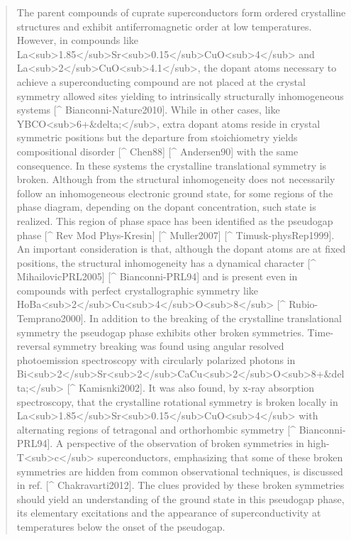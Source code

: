 \begin{quote}
The parent compounds of cuprate superconductors form ordered crystalline structures and exhibit antiferromagnetic order at low temperatures. 
However,  in compounds like La<sub>1.85</sub>Sr<sub>0.15</sub>CuO<sub>4</sub> and La<sub>2</sub>CuO<sub>4.1</sub>, the dopant atoms necessary to achieve a superconducting compound are not placed at the crystal symmetry allowed sites yielding to intrinsically structurally inhomogeneous systems [^ Bianconni-Nature2010]. 
While in other cases, like YBCO<sub>6+&delta;</sub>, extra dopant atoms reside in crystal symmetric positions but the departure from stoichiometry yields compositional disorder [^ Chen88] [^ Andersen90] with the same consequence. 
In these systems the crystalline translational symmetry is broken. 
Although from the structural inhomogeneity does not necessarily follow an inhomogeneous electronic ground state, for some regions of the phase diagram, depending on the dopant concentration, such state is realized. 
This region of phase space has been identified as the pseudogap phase [^ Rev Mod Phys-Kresin] [^ Muller2007] [^ Timusk-physRep1999]. 
An important consideration is that, although the dopant atoms are at fixed positions, the structural inhomogeneity has a dynamical character [^ MihailovicPRL2005] [^ Bianconni-PRL94] and is present even in compounds with perfect crystallographic symmetry like HoBa<sub>2</sub>Cu<sub>4</sub>O<sub>8</sub> [^ Rubio-Temprano2000]. 
In addition to the breaking of the crystalline translational symmetry the pseudogap phase exhibits other broken symmetries. 
Time-reversal symmetry breaking was found using angular resolved photoemission spectroscopy with circularly polarized photons in Bi<sub>2</sub>Sr<sub>2</sub>CaCu<sub>2</sub>O<sub>8+&delta;</sub> [^ Kamisnki2002]. 
It was also found, by x-ray absorption spectroscopy, that the crystalline rotational symmetry is broken locally in La<sub>1.85</sub>Sr<sub>0.15</sub>CuO<sub>4</sub> with alternating regions of tetragonal and orthorhombic symmetry [^ Bianconni-PRL94].
A perspective of the observation of broken symmetries in high-T<sub>c</sub> superconductors, emphasizing that some of these broken symmetries are hidden from common observational techniques, is discussed in ref. [^ Chakravarti2012]. 
The clues provided by these broken symmetries should yield an understanding of the ground state in this pseudogap phase, its elementary excitations and the appearance of superconductivity at temperatures below the onset of the pseudogap. 
\end{quote}

